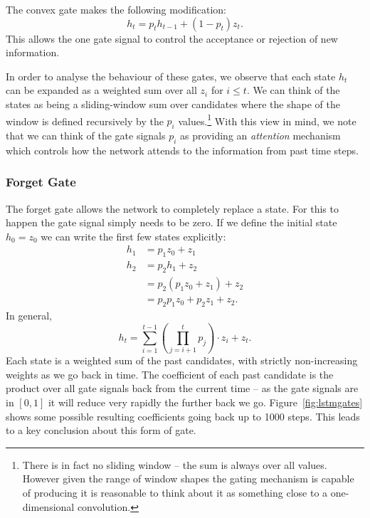 The convex gate makes the following modification:
\begin{equation}
	h_t = p_th_{t-1} + (1-p_t)z_t.
	\label{eq:cvexgate}
\end{equation} This allows the one gate signal
to control the acceptance or rejection of new information.

In order to analyse the behaviour of these gates, we observe that each state \(h_t\)
can be expanded as a weighted sum over all \(z_i\) for \(i \leq t\). We can think of
the states as being a sliding-window sum over candidates where the shape of the window is defined
recursively by the \(p_i\) values.\footnote{There is in fact no sliding window -- the sum is always
over all values. However given the range of window shapes the gating mechanism is capable of producing
it is reasonable to think about it as something close to a one-dimensional convolution.}
With this view in mind, we note that we can think of the
gate signals \(p_i\) as providing an \emph{attention} mechanism which controls how the network
attends to the information from past time steps.

\subsubsection{Forget Gate}
The forget gate allows the network to completely replace a state.
For this to happen the gate signal simply needs to be zero. If we define the initial
state \(h_0 = z_0\) we can write the first few states explicitly:
\begin{align}
	h_1 &= p_1z_0 + z_1 \\
	h_2 &= p_2h_1 + z_2 \\
		&= p_2(p_1z_0 + z_1) + z_2 \\
		&= p_2p_1z_0 + p_2z_1 + z_2.
\end{align} In general,
\begin{equation}
	h_t = \sum_{i=1}^{t-1} \left(\prod_{j=i+1}^t p_j\right) \cdot z_i + z_t.
\end{equation} Each state is a weighted sum of the past candidates, with strictly
non-increasing weights as we go back in time.
The coefficient of each past candidate is the product over all gate signals back from the
current time -- as the gate signals are in \([0, 1]\) it will reduce very rapidly the further
back we go.
Figure~\ref{fig:lstmgates} shows some possible resulting coefficients going back up to 1000 steps.
This leads to a key conclusion about this form of gate.

